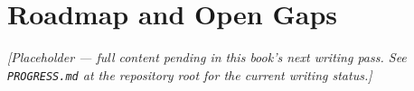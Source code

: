 \chapter{Roadmap and Open Gaps}
\label{ch:roadmap}

\emph{[Placeholder --- full content pending in this book's next writing pass. See \texttt{PROGRESS.md} at the repository root for the current writing status.]}
